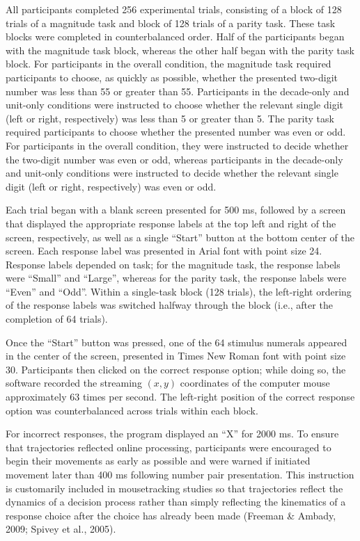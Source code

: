 \documentclass[english,man]{apa6}
\theoremstyle{definition}
\theoremstyle{definition}
\theoremstyle{definition}
\theoremstyle{remark}
\begin{document}
All participants completed 256 experimental trials, consisting of a
block of 128 trials of a magnitude task and block of 128 trials of a
parity task. These task blocks were completed in counterbalanced order.
Half of the participants began with the magnitude task block, whereas
the other half began with the parity task block. For participants in the
overall condition, the magnitude task required participants to choose,
as quickly as possible, whether the presented two-digit number was less
than 55 or greater than 55. Participants in the decade-only and
unit-only conditions were instructed to choose whether the relevant
single digit (left or right, respectively) was less than 5 or greater
than 5. The parity task required participants to choose whether the
presented number was even or odd. For participants in the overall
condition, they were instructed to decide whether the two-digit number
was even or odd, whereas participants in the decade-only and unit-only
conditions were instructed to decide whether the relevant single digit
(left or right, respectively) was even or odd.

Each trial began with a blank screen presented for 500 ms, followed by a
screen that displayed the appropriate response labels at the top left
and right of the screen, respectively, as well as a single
\enquote{Start} button at the bottom center of the screen. Each response
label was presented in Arial font with point size 24. Response labels
depended on task; for the magnitude task, the response labels were
\enquote{Small} and \enquote{Large}, whereas for the parity task, the
response labels were \enquote{Even} and \enquote{Odd}. Within a
single-task block (128 trials), the left-right ordering of the response
labels was switched halfway through the block (i.e., after the
completion of 64 trials).

Once the \enquote{Start} button was pressed, one of the 64 stimulus
numerals appeared in the center of the screen, presented in Times New
Roman font with point size 30. Participants then clicked on the correct
response option; while doing so, the software recorded the streaming
\((x, y)\) coordinates of the computer mouse approximately 63 times per
second. The left-right position of the correct response option was
counterbalanced across trials within each block.

For incorrect responses, the program displayed an \enquote{X} for 2000
ms. To ensure that trajectories reflected online processing,
participants were encouraged to begin their movements as early as
possible and were warned if initiated movement later than 400 ms
following number pair presentation. This instruction is customarily
included in mousetracking studies so that trajectories reflect the
dynamics of a decision process rather than simply reflecting the
kinematics of a response choice after the choice has already been made
(Freeman \& Ambady, 2009; Spivey et al., 2005).
\end{document}
